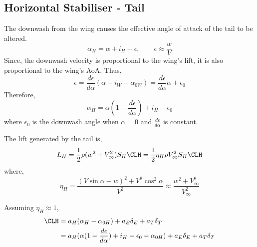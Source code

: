 \subsection{Horizontal Stabiliser - Tail}
The downwash from the wing causes the effective angle of attack of the tail to be altered.
\begin{equation}
  \alpha_H = \alpha + i_H - \epsilon,\qquad \epsilon \approx \frac{w}{V} 
\end{equation}
Since, the downwash velocity is proportional to the wing's lift, it is also proportional to the wing's AoA. Thus,
\begin{equation}
  \epsilon = \frac{d\epsilon}{d\alpha}(\alpha + i_W - \alpha_{0W}) = \frac{d\epsilon}{d\alpha}\alpha + \epsilon_0
\end{equation}
Therefore,
\begin{equation}
  \alpha_H = \alpha\left(1- \frac{d\epsilon}{d\alpha}\right)+i_H - \epsilon_0
\end{equation}
where $\epsilon_0$ is the downwash angle when $\alpha = 0$ and $\frac{d\epsilon}{d\alpha}$ is constant.

The lift generated by the tail is,
\begin{equation}
  L_H = \frac{1}{2}\rho(w^2 + V_\infty^2)S_H\CLH = \frac{1}{2}\eta_H\rho V_\infty^2S_H\CLH 
\end{equation}
where,
\begin{equation}
  \eta_H = \frac{(V\sin\alpha-w)^2+V^2\cos^2\alpha}{V^2} \approx \frac{w^2+V_\infty^2}{V^2_\infty}
\end{equation}

Assuming $\eta_H \approx 1$,
\begin{align}
  \CLH &= a_H(\alpha_H-\alpha_{0H})+a_E\delta_E+a_T\delta_T\\ &= a_H(\alpha(1-\frac{d\epsilon}{d\alpha})+i_H-\epsilon_0-\alpha_{0H})+a_E\delta_E+a_T\delta_T
\end{align}
